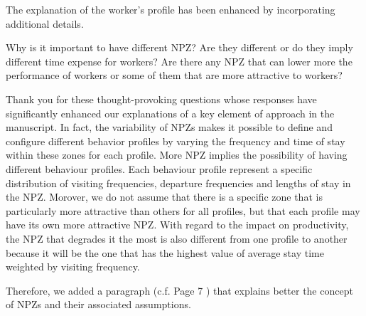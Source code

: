 \documentclass[preprint,11pt,3p]{elsarticle}
\begin{document}
\begin{tcolorbox}[colback=r_color1,colframe=r_color2,title=Response Q7 :]
	The explanation of the worker's profile has been enhanced by incorporating additional details. 
\end{tcolorbox}
\begin{tcolorbox}[colback=q_color1,colframe=q_color2,title=Q8  :]	
	Why is it important to have different NPZ? Are they different or do they imply different time expense for workers? Are there any NPZ that can lower more the performance of workers or some of them that are more attractive to workers?
\end{tcolorbox}


\begin{tcolorbox}[colback=r_color1,colframe=r_color2,title=Response Q8  :]
	Thank you for these thought-provoking questions whose responses have significantly enhanced our explanations of a key element of approach in the manuscript.
	In fact, the variability of NPZs makes it possible to define and configure different behavior profiles by varying the frequency and time of stay within these zones for each profile. More NPZ implies the possibility of having different behaviour profiles. Each behaviour profile represent a specific distribution of visiting frequencies, departure frequencies and lengths of stay in the NPZ.
	Morover, we do not assume that there is a specific zone that is particularly more attractive than others for all profiles, but that each profile may have its own more attractive NPZ. With regard to the impact on productivity, the NPZ that degrades it the most is also different from one profile to another because it will be the one that has the highest value of average stay time weighted by visiting frequency.
	
	Therefore, we added a paragraph (c.f. Page 7 ) that explains better the concept of NPZs and their associated assumptions.
	
	
	
	
	
	

\end{tcolorbox}
\end{document}
